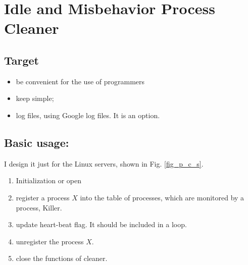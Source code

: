 
\chapter{Idle and Misbehavior Process Cleaner} %



\ifpdf
    \graphicspath{{process_cleaner_project/figures/PNG/}{process_cleaner_project/figures/PDF/}{process_cleaner_project/figures/}}
\else
    \graphicspath{{process_cleaner_project/figures/EPS/}{process_cleaner_project/figures/}}
\fi


\section{Target}
\begin{itemize}
\item be convenient for the use of programmers
\item keep simple;
\item log files, using Google log files. It is an option.
\end{itemize}

\section{Basic usage:}
I design it just for the Linux servers, shown in Fig. \ref{fig_p_c_s}. 

\begin{enumerate}
\item Initialization or open
\item register a process $X$ into the table of processes, which are monitored by a process, Killer.
\item update heart-beat flag. It should be included in a loop.
\item unregister the process $X$.
\item close the functions of cleaner.
\end{enumerate}

